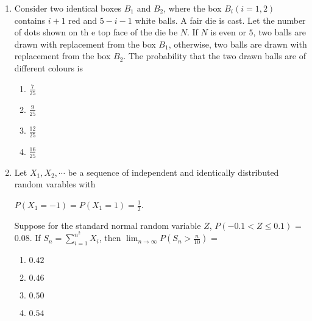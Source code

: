 \documentclass[journal]{IEEEtran}
\theoremstyle{remark}
\begin{document}
\begin{enumerate}
                \item Consider two identical boxes $B_{1}$ and $B_{2}$, where the box $B_{i}(i=1,2)$ contains $i+1$ red and  $5-i-1$ white balls. A fair die is cast. Let the number of dots shown on th                      e top face of the die be $ N$. If $ N$ is even or $5$, two balls are drawn with replacement from the box $B_{1}$, otherwise, two balls are drawn with replacement from the box $B_                      {2}$. The probability that the two drawn balls are of different colours is 
                \begin{multicols}{4}
                \begin{enumerate}
                    \item $\frac{7}{25}$
                    \item $\frac{9}{25}$
                    \item $\frac{12}{25}$
                    \item $\frac{16}{25}$
                \end{enumerate}
                \end{multicols}

                \item Let $X_1,X_2, \cdots$ be a sequence of independent and identically distributed random varables with
                \begin{center}
                   $P(X_1=-1) = P(X_1=1) = \frac{1}{2}$. 
                \end{center}
                Suppose for the standard normal random  variable $Z$, $P(-0.1<Z\le0.1)$ = $0.08$.
                If $S_n = \sum_{i=1}^{n^2} X_i$, then $\lim_{n \to \infty} P(S_n>\frac{n}{10})$ =
                \begin{multicols}{4}
                \begin{enumerate}
                    \item $0.42$
                    \item $0.46$
                    \item $0.50$
                    \item $0.54$
                \end{enumerate}
                    
                \end{multicols}


\end{enumerate}
\end{document}

